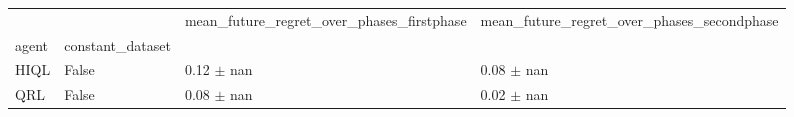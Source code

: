 \begin{tabular}{llll}
\toprule
 &  & mean_future_regret_over_phases_firstphase & mean_future_regret_over_phases_secondphase \\
agent & constant_dataset &  &  \\
\midrule
HIQL & False & 0.12 $\pm$ nan & 0.08 $\pm$ nan \\
\cline{1-4}
QRL & False & 0.08 $\pm$ nan & 0.02 $\pm$ nan \\
\cline{1-4}
\bottomrule
\end{tabular}
